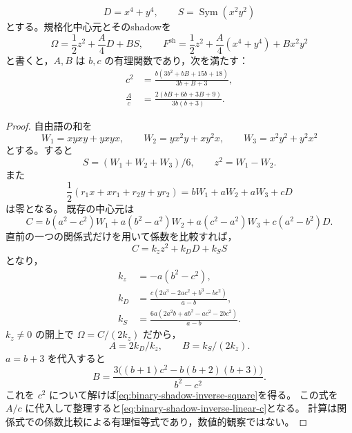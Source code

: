 \begin{lemma}[中心式の完全対称化座標]
\label{lem:binary-shadow-explicit-coordinates}
\[
 D=x^4+y^4,\qquad S=\operatorname{Sym}(x^2y^2)
\]
とする。規格化中心元とそのshadowを
\[
 \Omega=\frac12z^2+\frac A4D+BS,
 \qquad F^{\mathrm{sh}}=\frac12z^2+\frac A4(x^4+y^4)+Bx^2y^2
\]
と書くと，$A,B$ は $b,c$ の有理関数であり，次を満たす：
\begin{align}
 c^2&=\frac{b(3b^2+bB+15b+18)}{3b+B+3},
 \label{eq:binary-shadow-inverse-square}\\
 \frac Ac&=\frac{2(bB+6b+3B+9)}{3b(b+3)}.
 \label{eq:binary-shadow-inverse-linear-c}
\end{align}
\end{lemma}
\begin{proof}
自由語の和を
\[
 W_1=xyxy+yxyx,\qquad
 W_2=yx^2y+xy^2x,\qquad
 W_3=x^2y^2+y^2x^2
\]
とする。すると
\[
 S=(W_1+W_2+W_3)/6,\qquad z^2=W_1-W_2.
\]
また
\[
 \frac12(r_1x+xr_1+r_2y+yr_2)
              =bW_1+aW_2+aW_3+cD
\]
は零となる。
既存の中心元は
\[
 C=b(a^2-c^2)W_1+a(b^2-a^2)W_2
                  +a(c^2-a^2)W_3+c(a^2-b^2)D.
\]
直前の一つの関係式だけを用いて係数を比較すれば，
\[
 C=k_z z^2+k_DD+k_SS
\]
となり，
\begin{align*}
 k_z&=-a(b^2-c^2),\\
 k_D&=\frac{c(2a^3-2ac^2+b^3-bc^2)}{a-b},\\
 k_S&=\frac{6a(2a^2b+ab^2-ac^2-2bc^2)}{a-b}.
\end{align*}
$k_z\ne0$ の開上で $\Omega=C/(2k_z)$ だから，
\[
 A=2k_D/k_z,\qquad B=k_S/(2k_z).
\]
$a=b+3$ を代入すると
\[
 B=\frac{3\bigl((b+1)c^2-b(b+2)(b+3)\bigr)}{b^2-c^2}.
\]
これを $c^2$ について解けば\eqref{eq:binary-shadow-inverse-square}を得る。
この式を $A/c$ に代入して整理すると\eqref{eq:binary-shadow-inverse-linear-c}となる。
計算は関係式での係数比較による有理恒等式であり，数値的観察ではない。
\end{proof}

